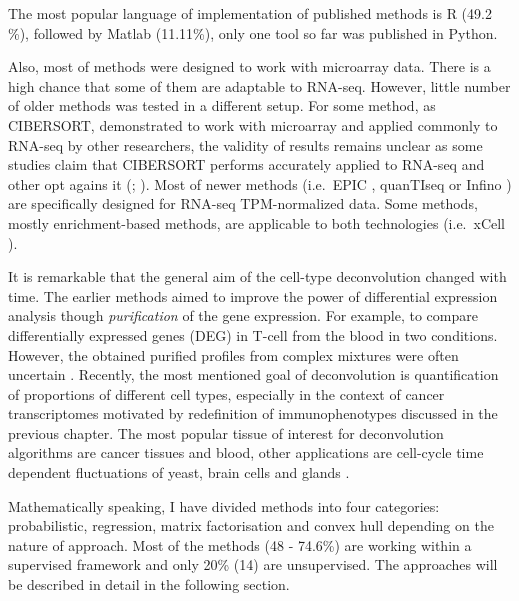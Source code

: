\documentclass[12pt,]{book}
\theoremstyle{definition}
\theoremstyle{definition}
\theoremstyle{definition}
\theoremstyle{remark}
\begin{document}
The most popular language of implementation of published methods is R
(49.2 \%), followed by Matlab (11.11\%), only one tool so far was
published in Python.

Also, most of methods were designed to work with microarray data. There
is a high chance that some of them are adaptable to RNA-seq. However,
little number of older methods was tested in a different setup. For some
method, as CIBERSORT, demonstrated to work with microarray and applied
commonly to RNA-seq by other researchers, the validity of results
remains unclear as some studies claim that CIBERSORT performs accurately
applied to RNA-seq \citep{Thorsson2018} and other opt agains it
(\citet{Li2017}; \citet{Tamborero2018}). Most of newer methods
(i.e.~EPIC \citep{Racle2017}, quanTIseq \citep{Finotello2017} or Infino
\citep{Zaslavsky2017}) are specifically designed for RNA-seq
TPM-normalized data. Some methods, mostly enrichment-based methods, are
applicable to both technologies (i.e.~xCell \citep{Aran2017}).

It is remarkable that the general aim of the cell-type deconvolution
changed with time. The earlier methods aimed to improve the power of
differential expression analysis though \emph{purification} of the gene
expression. For example, to compare differentially expressed genes (DEG)
in T-cell from the blood in two conditions. However, the obtained
purified profiles from complex mixtures were often uncertain
\citep{Onuchic2016}. Recently, the most mentioned goal of deconvolution
is quantification of proportions of different cell types, especially in
the context of cancer transcriptomes motivated by redefinition of
immunophenotypes discussed in the previous chapter. The most popular
tissue of interest for deconvolution algorithms are cancer tissues and
blood, other applications are cell-cycle time dependent fluctuations of
yeast, brain cells and glands .

Mathematically speaking, I have divided methods into four categories:
probabilistic, regression, matrix factorisation and convex hull
depending on the nature of approach. Most of the methods (48 - 74.6\%)
are working within a supervised framework and only 20\% (14) are
unsupervised. The approaches will be described in detail in the
following section.
\end{document}
